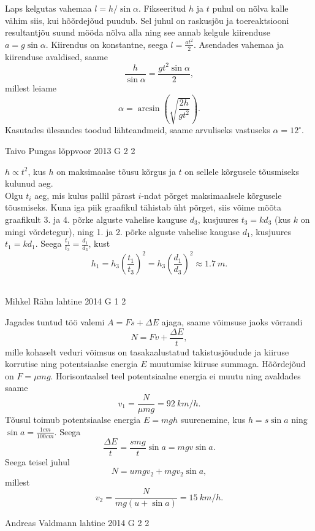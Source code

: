 \documentclass[11pt]{article}
\begin{document}
{{\ifSolution
Laps kelgutas vahemaa $l=h / \sin \alpha$. Fikseeritud $h$ ja $t$ puhul on nõlva kalle vähim siis, kui hõõrdejõud puudub. Sel juhul on raskusjõu ja toereaktsiooni resultantjõu suund mööda nõlva alla ning see annab kelgule kiirenduse $a=g \sin \alpha$. Kiirendus on konstantne, seega $l=\frac{a t^2}{2}$. Asendades vahemaa ja kiirenduse avaldised, saame
\[
\frac{h}{\sin\alpha} = \frac{g t^2 \sin \alpha}{2},
\]
millest leiame
\[
\alpha = \arcsin\left( \sqrt{\frac{2h}{g t^2}}\right).
\]
Kasutades ülesandes toodud lähteandmeid, saame arvuliseks vastuseks $\alpha = 12^\circ$. 
\fi
}

{Taivo Pungas} %
{lõppvoor} %
{2013} %
{G 2} %
{2} %
{

\ifSolution
$h \propto t^{2}$, kus $h$ on maksimaalse tõusu kõrgus ja $t$ on sellele kõrgusele tõusmiseks kulunud aeg.\\
Olgu $t_{i}$ aeg, mis kulus pallil pärast $i$-ndat põrget maksimaalsele kõrgusele tõusmiseks. Kuna iga piik graafikul tähistab üht põrget, siis võime mõõta graafikult 3. ja 4. põrke alguste vahelise kauguse $d_{3}$, kusjuures $t_{3}=kd_{3}$ (kus $k$ on mingi võrdetegur), ning 1. ja 2. põrke alguste vahelise kauguse $d_{1}$, kusjuures $t_{1}=kd_{1}$. Seega 
$\frac{t_{1}}{t_{3}}=\frac{d_{1}}{d_{3}}$, kust
$$h_{1}=h_{3}\left(\frac{t_{1}}{t_{3}}\right)^{2}=h_{3}\left(\frac{d_{1}}{d_{3}}\right)^{2} \approx \SI{1,7}{m}.$$\\
\fi
}

{Mihkel Rähn} %
{lahtine} %
{2014} %
{G 1} %
{2} %
{

\ifSolution
Jagades tuntud töö valemi $A=Fs+\Delta E$ ajaga, saame võimsuse jaoks võrrandi 
\[
N=Fv+\frac{\Delta E}{t},
\]
mille kohaselt veduri võimsus on tasakaalustatud takistusjõudude ja kiiruse korrutise ning potentsiaalse energia $E$ muutumise kiiruse summaga. Hõõrdejõud on $F=\mu mg$. Horisontaalsel teel potentsiaalne energia ei muutu ning avaldades saame
\[
v_1=\frac{N}{\mu mg}=\SI{92}{km \per h}.
\]
Tõusul toimub potentsiaalse energia $E=mgh$ suurenemine, kus $h=s\sin a$ ning $\sin a=\frac{1cm}{100cm}$. Seega
\[
\frac{\Delta E}{t}=\frac{smg}{t}\sin a=mgv\sin a.
\]
Seega teisel juhul
\[
N=umgv_2+mgv_2\sin a,
\]
millest
\[
v_2=\frac{N}{mg(u+\sin a)}=\SI{15}{km \per h}.
\]
\fi
}

{Andreas Valdmann} %
{lahtine} %
{2014} %
{G 2} %
{2} %
{

}}
\end{document}
